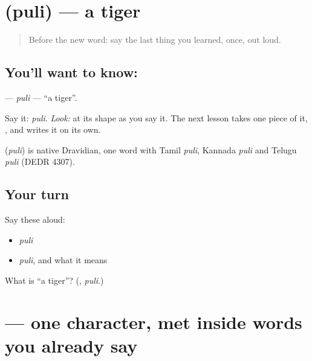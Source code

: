 \section[\texorpdfstring{\ml{പുലി} (puli)}{പുലി (puli)}]{ (puli) — a tiger}

\label{lesson:ML-C02-puli}



\begin{quote}
Before the new word: say the last thing you learned, once, out loud.
\end{quote}

\subsection*{You'll want to know: }
\textbf{} — \emph{puli} — \textquotedblleft{}a tiger\textquotedblright{}.

Say it: \emph{puli}. \emph{Look:} at its shape as you say it. The next lesson takes one piece of it, \textbf{}, and writes it on its own.

\begin{cousinweb}
\textbf{} (\emph{puli}) is native Dravidian, one word with Tamil \emph{puli}, Kannada \emph{puli} and Telugu \emph{puli} (DEDR 4307).
\end{cousinweb}

\subsection*{Your turn}
Say these aloud:

\begin{itemize}
\raggedright
  \item \emph{puli}
  \item \emph{puli}, and what it means
\end{itemize}

\begin{tcolorbox}[breakable,colback=teal!4,colframe=teal!35!black,title={Before you move on}]
What is \textquotedblleft{}a tiger\textquotedblright{}? (\textbf{}, \emph{puli}.)
\end{tcolorbox}
\section[\texorpdfstring{\ml{ു} (u)}{ു (u)}]{ — one character, met inside words you already say}

\label{lesson:ML-S07-vowel-sign-u}



